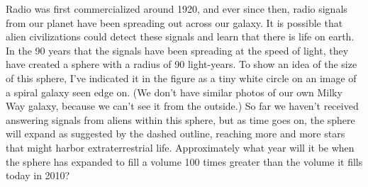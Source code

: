 Radio was first commercialized around 1920, and ever since then, radio signals from our
planet have been spreading out across our galaxy. It is possible that alien civilizations
could detect these signals and learn that there is life on earth. In the 90 years that
the signals have been spreading at the speed of light, they have created a sphere with a radius of 90 light-years.
To show an idea of the size of this sphere, I've indicated it in the figure as a tiny white circle on an image
of a spiral galaxy seen edge on. (We don't have similar photos of our own Milky Way galaxy, because we can't
see it from the outside.) So far we haven't received answering signals from aliens within this sphere,
but as time goes on, the sphere will expand as suggested by the dashed outline, reaching more and more stars that might harbor extraterrestrial
life. Approximately what year will it be when the sphere has expanded to fill a volume 100 times greater than
the volume it fills today in 2010?
\answercheck
